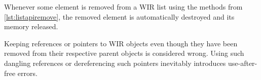 Whenever some element is removed from a \gls{WIR} list using the methods from \cref{lst:listapiremove}, the removed element is automatically destroyed and its memory released.

\begin{wirWarn}
  Keeping references or pointers to \gls{WIR} objects even though they have been removed from their respective parent objects is considered wrong.
  Using such dangling references or dereferencing such pointers inevitably introduces use-after-free errors.
\end{wirWarn}

\cleardoubleoddpage

